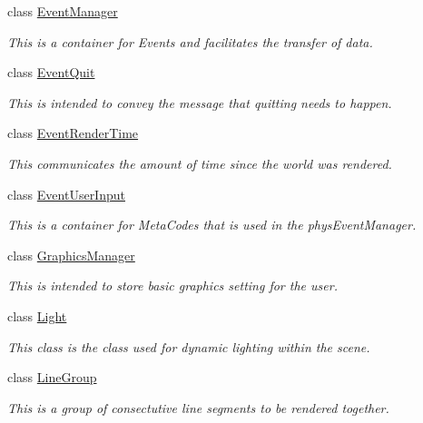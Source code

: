 \begin{DoxyCompactItemize}
class \hyperlink{classphys_1_1EventManager}{EventManager}
\begin{DoxyCompactList}\small\item\em This is a container for Events and facilitates the transfer of data. \item\end{DoxyCompactList}\item 
class \hyperlink{classphys_1_1EventQuit}{EventQuit}
\begin{DoxyCompactList}\small\item\em This is intended to convey the message that quitting needs to happen. \item\end{DoxyCompactList}\item 
class \hyperlink{classphys_1_1EventRenderTime}{EventRenderTime}
\begin{DoxyCompactList}\small\item\em This communicates the amount of time since the world was rendered. \item\end{DoxyCompactList}\item 
class \hyperlink{classphys_1_1EventUserInput}{EventUserInput}
\begin{DoxyCompactList}\small\item\em This is a container for MetaCodes that is used in the physEventManager. \item\end{DoxyCompactList}\item 
class \hyperlink{classphys_1_1GraphicsManager}{GraphicsManager}
\begin{DoxyCompactList}\small\item\em This is intended to store basic graphics setting for the user. \item\end{DoxyCompactList}\item 
class \hyperlink{classphys_1_1Light}{Light}
\begin{DoxyCompactList}\small\item\em This class is the class used for dynamic lighting within the scene. \item\end{DoxyCompactList}\item 
class \hyperlink{classphys_1_1LineGroup}{LineGroup}
\begin{DoxyCompactList}\small\item\em This is a group of consectutive line segments to be rendered together. \item\end{DoxyCompactList}\item 

\end{DoxyCompactItemize}
